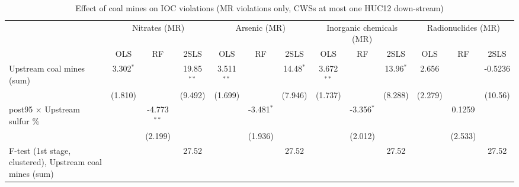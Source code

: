 
\begin{table}[htbp]
   
   \caption{\label{2sls_dwnstrm_minevio_mr_ivsum} Effect of coal mines on IOC violations (MR violations only, CWSs at most one HUC12 down-stream)}
   \bigskip
   
   \centering
   
   \begin{adjustbox}{width = \textwidth, center}
      
      
      \begin{tabular}{lcccccccccccc}
         \toprule
         
          & \multicolumn{3}{c}{Nitrates (MR)} & \multicolumn{3}{c}{Arsenic (MR)} & \multicolumn{3}{c}{Inorganic chemicals (MR)} & \multicolumn{3}{c}{Radionuclides (MR)}\\
         
                                                                  & OLS           & RF            & 2SLS          & OLS           & RF            & 2SLS          & OLS           & RF            & 2SLS          & OLS           & RF            & 2SLS\\  
         
         \midrule 
         Upstream coal mines (sum)                                & 3.302$^{*}$   &               & 19.85$^{**}$  & 3.511$^{**}$  &               & 14.48$^{*}$   & 3.672$^{**}$  &               & 13.96$^{*}$   & 2.656         &               & -0.5236\\   
                                                                  & (1.810)       &               & (9.492)       & (1.699)       &               & (7.946)       & (1.737)       &               & (8.288)       & (2.279)       &               & (10.56)\\   
         post95 $\times$ Upstream sulfur \%                       &               & -4.773$^{**}$ &               &               & -3.481$^{*}$  &               &               & -3.356$^{*}$  &               &               & 0.1259        &   \\   
                                                                  &               & (2.199)       &               &               & (1.936)       &               &               & (2.012)       &               &               & (2.533)       &   \\   
         
         F-test (1st stage, clustered), Upstream coal mines (sum) &               &               & 27.52         &               &               & 27.52         &               &               & 27.52         &               &               & 27.52\\  
         

\end{tabular}
\end{adjustbox}
\end{table}
